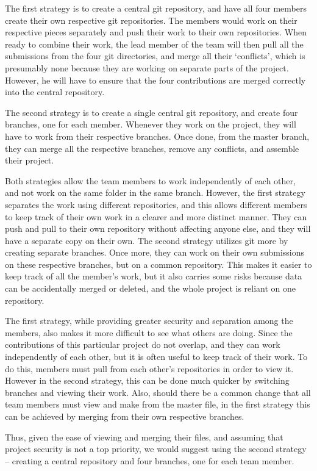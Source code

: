 \documentclass[12pt]{article}
\begin{document}
The first strategy is to create a central git repository, and have all four members create their own respective git repositories. The members would work on their respective pieces separately and push their work to their own repositories. When ready to combine their work, the lead member of the team will then pull all the submissions from the four git directories, and merge all their ‘conflicts’, which is presumably none because they are working on separate parts of the project. However, he will have to ensure that the four contributions are merged correctly into the central repository. 

The second strategy is to create a single central git repository, and create four branches, one for each member. Whenever they work on the project, they will have to work from their respective branches. Once done, from the master branch, they can merge all the respective branches, remove any conflicts, and assemble their project. 

Both strategies allow the team members to work independently of each other, and not work on the same folder in the same branch. However, the first strategy separates the work using different repositories, and this allows different members to keep track of their own work in a clearer and more distinct manner. They can push and pull to their own repository without affecting anyone else, and they will have a separate copy on their own. The second strategy utilizes git more by creating separate branches. Once more, they can work on their own submissions on these respective branches, but on a common repository. This makes it easier to keep track of all the member’s work, but it also carries some risks because data can be accidentally merged or deleted, and the whole project is reliant on one repository. 

The first strategy, while providing greater security and separation among the members, also makes it more difficult to see what others are doing. Since the contributions of this particular project do not overlap, and they can work independently of each other, but it is often useful to keep track of their work. To do this, members must pull from each other’s repositories in order to view it. However in the second strategy, this can be done much quicker by switching branches and viewing their work. Also, should there be a common change that all team members must view and make from the master file, in the first strategy this can be achieved by merging from their own respective branches. 

Thus, given the ease of viewing and merging their files, and assuming that project security is not a top priority, we would suggest using the second strategy – creating a central repository and four branches, one for each team member. 
\end{document}
